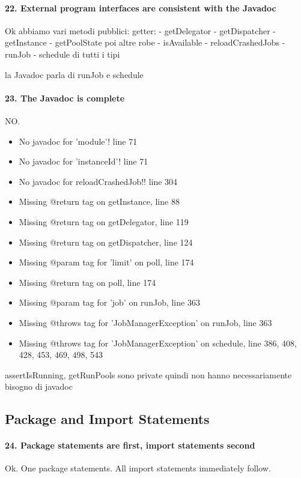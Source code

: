 \documentclass[english]{article}
\begin{document}
\paragraph{22. External program interfaces are consistent with the Javadoc}
Ok
abbiamo vari metodi pubblici:
getter:
- getDelegator
- getDispatcher
- getInstance
- getPoolState
poi altre robe
- isAvailable
- reloadCrashedJobs
- runJob
- schedule di tutti i tipi

la Javadoc parla di runJob e schedule

\paragraph{23. The Javadoc is complete}
NO.
\begin{itemize}
	\item No javadoc for 'module'! line 71
	\item No javadoc for 'instanceId'! line 71
	\item No javadoc for reloadCrashedJob!! line 304
	\item Missing @return tag on getInstance, line 88
	\item Missing @return tag on getDelegator, line 119
	\item Missing @return tag on getDispatcher, line 124
	\item Missing @param tag for 'limit' on poll, line 174
	\item Missing @return tag on poll, line 174
	\item Missing @param tag for 'job' on runJob, line 363
	\item Missing @throws tag for 'JobManagerException' on runJob, line 363
	\item Missing @throws tag for 'JobManagerException' on schedule, line 386, 408, 428, 453, 469, 498, 543
\end{itemize}

assertIsRunning, getRunPools sono private quindi non hanno necessariamente bisogno di javadoc

\subsection{Package and Import Statements}
\paragraph{24. Package statements are first, import statements second}
Ok.
One package statements.
All import statements immediately follow.
\end{document}
